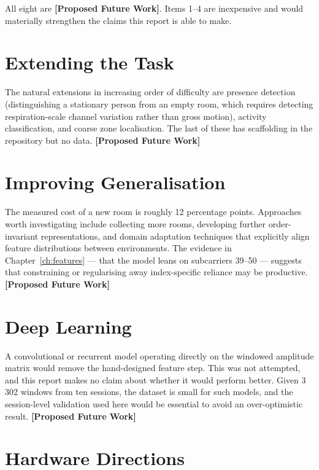 \documentclass[11pt,a4paper,oneside]{report}
\newcommand{\evidencetag}[2]{{\small\sffamily\bfseries\textcolor{#1}{[#2]}}}
\newcommand{\Fut}{\evidencetag{bad}{Proposed Future Work}}
\begin{document}
\noindent
All eight are \Fut. Items 1--4 are inexpensive and would materially strengthen
the claims this report is able to make.


\label{ch:future}

\section{Extending the Task}

The natural extensions in increasing order of difficulty are presence detection
(distinguishing a stationary person from an empty room, which requires
detecting respiration-scale channel variation rather than gross motion),
activity classification, and coarse zone localisation. The last of these has
scaffolding in the repository but no data. \Fut

\section{Improving Generalisation}

The measured cost of a new room is roughly 12 percentage points. Approaches
worth investigating include collecting more rooms, developing further
order-invariant representations, and domain adaptation techniques that
explicitly align feature distributions between environments. The evidence in
Chapter~\ref{ch:features} --- that the model leans on subcarriers 39--50 ---
suggests that constraining or regularising away index-specific reliance may be
productive. \Fut

\section{Deep Learning}

A convolutional or recurrent model operating directly on the windowed amplitude
matrix would remove the hand-designed feature step. This was not attempted, and
this report makes no claim about whether it would perform better. Given 3\,302
windows from ten sessions, the dataset is small for such models, and the
session-level validation used here would be essential to avoid an
over-optimistic result. \Fut

\section{Hardware Directions}
\end{document}
